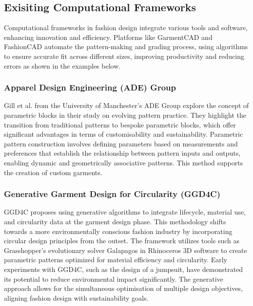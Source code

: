 \subsection{Exisiting Computational Frameworks}
Computational frameworks in fashion design integrate various tools and software, enhancing innovation and efficiency. Platforms like GarmentCAD and FashionCAD automate the pattern-making and grading process, using algorithms to ensure accurate fit across different sizes, improving productivity and reducing errors as shown in the examples below.

\subsubsection{Apparel Design Engineering (ADE) Group}
Gill et al. from the University of Manchester's ADE Group explore the concept of parametric blocks in their study on evolving pattern practice. They highlight the transition from traditional patterns to bespoke parametric blocks, which offer significant advantages in terms of customisability and sustainability. Parametric pattern construction involves defining parameters based on measurements and preferences that establish the relationship between pattern inputs and outputs, enabling dynamic and geometrically associative patterns. This method supports the creation of custom garments.

\subsubsection{Generative Garment Design for Circularity (GGD4C)}
GGD4C proposes using generative algorithms to integrate lifecycle, material use, and circularity data at the garment design phase. This methodology shifts towards a more environmentally conscious fashion industry by incorporating circular design principles from the outset. The framework utilizes tools such as Grasshopper's evolutionary solver Galapagos in Rhinoceros 3D software to create parametric patterns optimized for material efficiency and circularity. Early experiments with GGD4C, such as the design of a jumpsuit, have demonstrated its potential to reduce environmental impact significantly. The generative approach allows for the simultaneous optimisation of multiple design objectives, aligning fashion design with sustainability goals.

